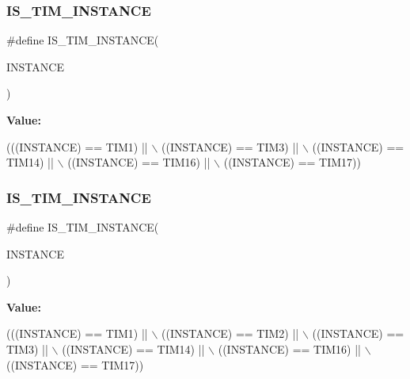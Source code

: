 \subsubsection{\texorpdfstring{I\+S\+\_\+\+T\+I\+M\+\_\+\+I\+N\+S\+T\+A\+N\+CE}{IS\_TIM\_INSTANCE}\hspace{0.1cm}{\footnotesize\ttfamily [3/16]}}
{\footnotesize\ttfamily \#define I\+S\+\_\+\+T\+I\+M\+\_\+\+I\+N\+S\+T\+A\+N\+CE(\begin{DoxyParamCaption}\item[{}]{I\+N\+S\+T\+A\+N\+CE }\end{DoxyParamCaption})}

{\bfseries Value\+:}
\begin{DoxyCode}
(((INSTANCE) == TIM1)    || \(\backslash\)
   ((INSTANCE) == TIM3)    || \(\backslash\)
   ((INSTANCE) == TIM14)   || \(\backslash\)
   ((INSTANCE) == TIM16)   || \(\backslash\)
   ((INSTANCE) == TIM17))
\end{DoxyCode}
\mbox{\label{group___exported__macro_gaba506eb03409b21388d7c5a6401a4f98}} 
\subsubsection{\texorpdfstring{I\+S\+\_\+\+T\+I\+M\+\_\+\+I\+N\+S\+T\+A\+N\+CE}{IS\_TIM\_INSTANCE}\hspace{0.1cm}{\footnotesize\ttfamily [4/16]}}
{\footnotesize\ttfamily \#define I\+S\+\_\+\+T\+I\+M\+\_\+\+I\+N\+S\+T\+A\+N\+CE(\begin{DoxyParamCaption}\item[{}]{I\+N\+S\+T\+A\+N\+CE }\end{DoxyParamCaption})}

{\bfseries Value\+:}
\begin{DoxyCode}
(((INSTANCE) == TIM1)    || \(\backslash\)
   ((INSTANCE) == TIM2)    || \(\backslash\)
   ((INSTANCE) == TIM3)    || \(\backslash\)
   ((INSTANCE) == TIM14)   || \(\backslash\)
   ((INSTANCE) == TIM16)   || \(\backslash\)
   ((INSTANCE) == TIM17))
\end{DoxyCode}
\mbox{\label{group___exported__macro_gaba506eb03409b21388d7c5a6401a4f98}} 

